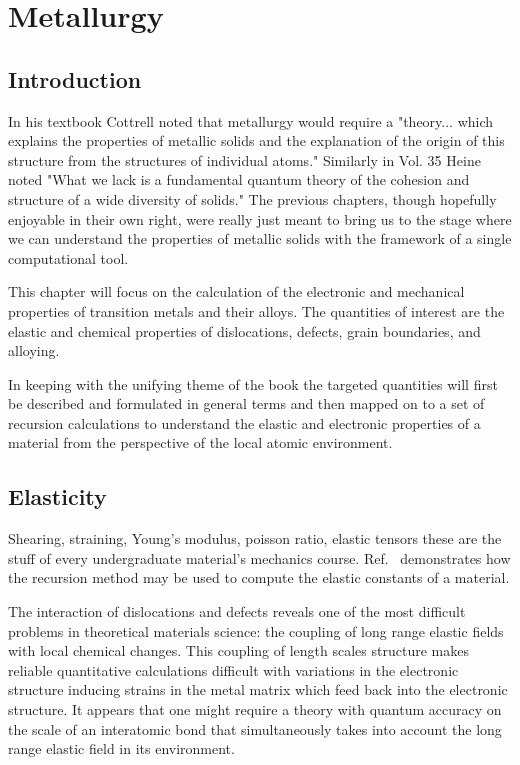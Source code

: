 \chapter{Metallurgy}
\label{chap:metallurgy}
\section{Introduction}
In his textbook Cottrell noted that metallurgy would require a "theory... which explains
the properties of metallic solids and the explanation of the origin of this
structure from the structures of individual atoms." Similarly in Vol. 35
Heine noted "What we lack is a fundamental quantum theory of the cohesion
and structure of a wide diversity of solids." The previous chapters,
though hopefully enjoyable in their own right, were really just meant to bring
us to the stage where we can understand the properties of metallic solids
with the framework of a single computational tool.

This chapter will focus on the calculation of the electronic and mechanical
properties of transition metals and their alloys. The quantities of interest
are the elastic and chemical properties of dislocations, defects,
grain boundaries, and alloying.

In keeping with the unifying theme of the book the targeted quantities
will first be described and formulated in general terms and then mapped
on to a set of recursion calculations to understand the elastic and
electronic properties of a material from the perspective of the local
atomic environment.

\section{Elasticity}
Shearing, straining, Young's modulus, poisson ratio, elastic tensors these are the
stuff of every undergraduate material's mechanics course.
Ref.~\cite{terakura84} demonstrates how the recursion method
may be used to compute the elastic constants of a material.

The interaction of dislocations and defects reveals one of the most difficult problems
in theoretical materials science: the coupling of long range elastic fields
with local chemical changes. This coupling of length scales structure makes
reliable quantitative calculations difficult with variations in the electronic structure
inducing strains in the metal matrix which feed back into the electronic structure. 
It appears that one might require a theory with quantum accuracy on the scale of an 
interatomic bond that simultaneously takes into account the long range elastic 
field in its environment.

